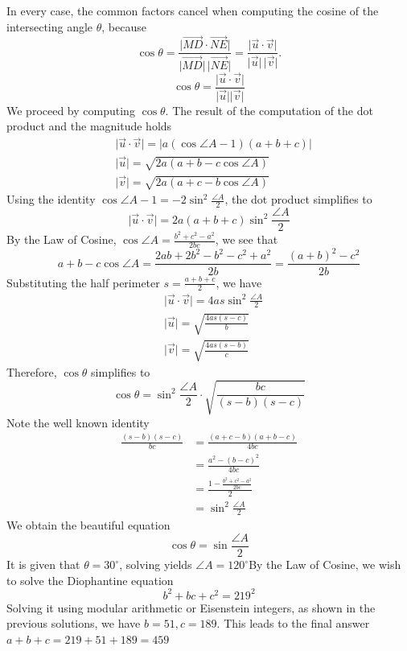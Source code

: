 \begin{enumerate}
 In every case, the common factors cancel when computing the cosine of the intersecting angle $\theta$, because
 \[\cos{\theta}=\frac{\lvert\overrightarrow{MD}\cdot\overrightarrow{NE}\rvert} {\lvert\overrightarrow{MD}\rvert\,\lvert\overrightarrow{NE}\rvert}=\frac{\lvert\vec{u}\cdot\vec{v}\rvert} {\lvert\vec{u}\rvert\,\lvert\vec{v}\rvert}.\]
 \[\cos{\theta}=\frac{\lvert\vec{u}\cdot\vec{v}\rvert}{\lvert\vec{u}\rvert\lvert\vec{v}\rvert}\]We proceed by computing $\cos{\theta}$. The result of the computation of the dot product and the magnitude holds\begin{equation*}\begin{aligned}&\lvert\vec{u}\cdot\vec{v}\rvert=\lvert a(\cos{\angle A}-1)(a+b+c)\rvert\\&\lvert\vec{u}\rvert=\sqrt{2a(a+b-c\cos{\angle A})}\\&\lvert\vec{v}\rvert=\sqrt{2a(a+c-b\cos{\angle A})}\end{aligned}\end{equation*}Using the identity $\cos{\angle A}-1=-2\sin^{2}{\frac{\angle A}{2}}$, the dot product simplifies to
 \[\lvert\vec{u}\cdot\vec{v}\rvert=2a(a+b+c)\sin^{2}{\frac{\angle A}{2}}\]By the Law of Cosine, $\cos{\angle A}=\frac{b^{2}+c^{2}-a^{2}}{2bc}$, we see that
 \[a+b-c\cos{\angle A}=\frac{2ab+2b^2-b^2-c^2+a^2}{2b}=\frac{(a+b)^2-c^2}{2b}\]Substituting the half perimeter $s=\frac{a+b+c}{2}$, we have\begin{equation*}\begin{aligned}&\lvert\vec{u}\cdot\vec{v}\rvert=4as\sin^{2}{\frac{\angle A}{2}}\\&\lvert\vec{u}\rvert=\sqrt{\frac{4as(s-c)}{b}}\\&\lvert\vec{v}\rvert=\sqrt{\frac{4as(s-b)}{c}}\end{aligned}\end{equation*}Therefore, $\cos{\theta}$ simplifies to
 \[\cos{\theta}=\sin^{2}{\frac{\angle A}{2}}\cdot\sqrt{\frac{bc}{(s-b)(s-c)}}\]Note the well known identity\begin{align*}\frac{(s-b)(s-c)}{bc}&=\frac{(a+c-b)(a+b-c)}{4bc}\\&=\frac{a^2-(b-c)^2}{4bc}\\&=\frac{1-\frac{b^2+c^2-a^2}{2bc}}{2}\\&=\sin^{2}{\frac{\angle A}{2}}\end{align*}
We obtain the beautiful equation
 \[\cos{\theta}=\sin{\frac{\angle A}{2}}\]It is given that $\theta=30^{\circ}$, solving yields $\angle A=120^{\circ}$By the Law of Cosine, we wish to solve the Diophantine equation
 \[b^2+bc+c^2=219^2\]Solving it using modular arithmetic or Eisenstein integers, as shown in the previous solutions, we have $b=51,c=189$. This leads to the final answer $a+b+c=219+51+189=\boxed{459}$




\end{enumerate}
